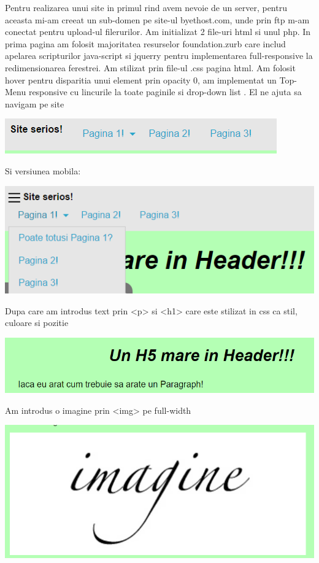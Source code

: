 Pentru realizarea unui site in primul rind avem nevoie de un server, pentru aceasta mi-am creeat un sub-domen pe site-ul byethost.com, unde prin ftp m-am conectat pentru upload-ul filerurilor.
Am initializat 2 file-uri html si unul php.
In prima pagina am folosit majoritatea resurselor foundation.zurb care includ apelarea scripturilor java-script si jquerry pentru implementarea full-responsive la redimensionarea ferestrei. Am stilizat prin file-ul .css pagina html. Am folosit hover pentru disparitia unui element prin opacity 0, am implementat un Top-Menu responsive cu lincurile la toate paginile si drop-down list . El ne ajuta sa navigam pe site
\begin{center}
\includegraphics[width=0.7\linewidth]{1}
\end{center}
Si versiunea mobila:
\begin{center}
\includegraphics[width=0.7\linewidth]{2}
\end{center}
Dupa care am introdus text prin <p> si <h1> care este stilizat in css ca stil, culoare si pozitie
\begin{center}
\includegraphics[width=0.7\linewidth]{3}
\end{center}
Am introdus o imagine prin <img> pe full-width
\begin{center}
\includegraphics[width=0.7\linewidth]{4}
\end{center}
